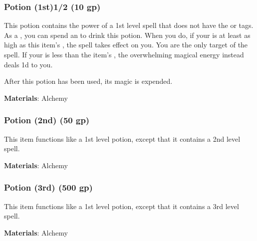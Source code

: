 
\lowercase{\hypertarget{item:Potion (1st)}{}}\label{item:Potion (1st)}
\hypertarget{item:Potion (1st)}{\subsubsection{Potion (1st)\hfill1/2 (10 gp)}}

This potion contains the power of a 1st level  spell that does not have the  or  tags.
As a , you can spend an  to drink this potion.
When you do, if your  is at least as high as this item's , the spell takes effect on you.
You are the only target of the spell.
If your  is less than the item's , the overwhelming magical energy instead deals  \minus1d to you.

After this potion has been used, its magic is expended.



\vspace{0.25em}
\textbf{Materials}: Alchemy


\lowercase{\hypertarget{item:Potion (2nd)}{}}\label{item:Potion (2nd)}
\hypertarget{item:Potion (2nd)}{\subsubsection{Potion (2nd)\hfill{} (50 gp)}}

This item functions like a 1st level potion, except that it contains a 2nd level spell.



\vspace{0.25em}
\textbf{Materials}: Alchemy


\lowercase{\hypertarget{item:Potion (3rd)}{}}\label{item:Potion (3rd)}
\hypertarget{item:Potion (3rd)}{\subsubsection{Potion (3rd)\hfill{} (500 gp)}}

This item functions like a 1st level potion, except that it contains a 3rd level spell.



\vspace{0.25em}
\textbf{Materials}: Alchemy


